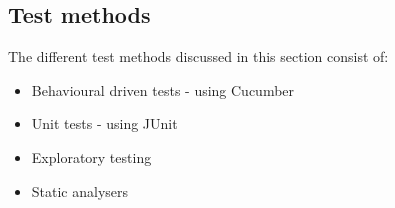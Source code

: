 \subsection{Test methods}
The different test methods discussed in this section consist of:
\begin{itemize}
    \item Behavioural driven tests - using Cucumber 
    \item Unit tests - using JUnit
    \item Exploratory testing
    \item Static analysers
\end{itemize}



% 
% 




